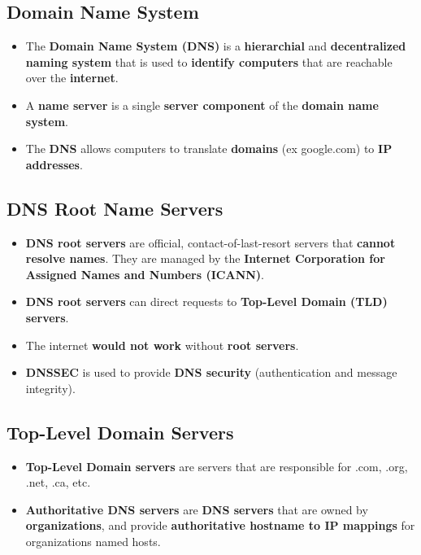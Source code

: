 \documentclass{article}
\begin{document}
    \subsection*{Domain Name System}
    \begin{itemize}
        \item The \textbf{Domain Name System (DNS)} is a \textbf{hierarchial} and \textbf{decentralized naming system} that is used to \textbf{identify computers} that are reachable over the \textbf{internet}.
        \item A \textbf{name server} is a single \textbf{server component} of the \textbf{domain name system}.
        \item The \textbf{DNS} allows computers to translate \textbf{domains} (ex google.com) to \textbf{IP addresses}. 
    \end{itemize}

    \subsection*{DNS Root Name Servers}
    \begin{itemize}
        \item \textbf{DNS root servers} are official, contact-of-last-resort servers that \textbf{cannot resolve names}. They are managed by the \textbf{Internet Corporation for Assigned Names and Numbers (ICANN)}.
        \item \textbf{DNS root servers} can direct requests to \textbf{Top-Level Domain (TLD) servers}.
        \item The internet \textbf{would not work} without \textbf{root servers}.
        \item \textbf{DNSSEC} is used to provide \textbf{DNS security} (authentication and message integrity).
    \end{itemize}

    \subsection*{Top-Level Domain Servers}
    \begin{itemize}
        \item \textbf{Top-Level Domain servers} are servers that are responsible for .com, .org, .net, .ca, etc.
        \item \textbf{Authoritative DNS servers} are \textbf{DNS servers} that are owned by \textbf{organizations}, and provide \textbf{authoritative hostname to IP mappings} for organizations named hosts.
    \end{itemize}
\end{document}
